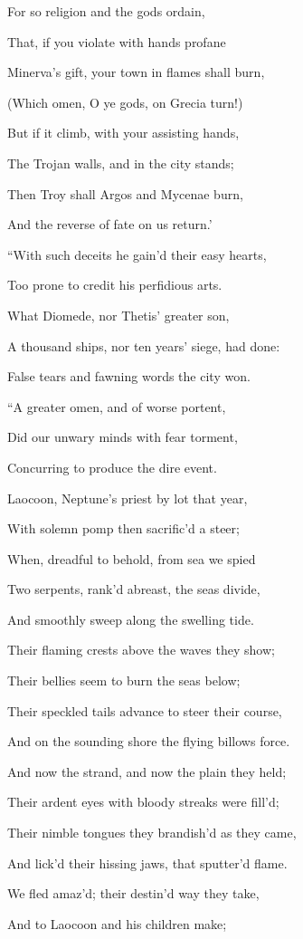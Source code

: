 For so religion and the gods ordain,

That, if you violate with hands profane

Minerva’s gift, your town in flames shall burn,

(Which omen, O ye gods, on Grecia turn!)

But if it climb, with your assisting hands,

The Trojan walls, and in the city stands;

Then Troy shall Argos and Mycenae burn,

And the reverse of fate on us return.’

“With such deceits he gain’d their easy hearts,

Too prone to credit his perfidious arts.

What Diomede, nor Thetis’ greater son,

A thousand ships, nor ten years’ siege, had done:

False tears and fawning words the city won.

“A greater omen, and of worse portent,

Did our unwary minds with fear torment,

Concurring to produce the dire event.

Laocoon, Neptune’s priest by lot that year,

With solemn pomp then sacrific’d a steer;

When, dreadful to behold, from sea we spied

Two serpents, rank’d abreast, the seas divide,

And smoothly sweep along the swelling tide.

Their flaming crests above the waves they show;

Their bellies seem to burn the seas below;

Their speckled tails advance to steer their course,

And on the sounding shore the flying billows force.

And now the strand, and now the plain they held;

Their ardent eyes with bloody streaks were fill’d;

Their nimble tongues they brandish’d as they came,

And lick’d their hissing jaws, that sputter’d flame.

We fled amaz’d; their destin’d way they take,

And to Laocoon and his children make;


